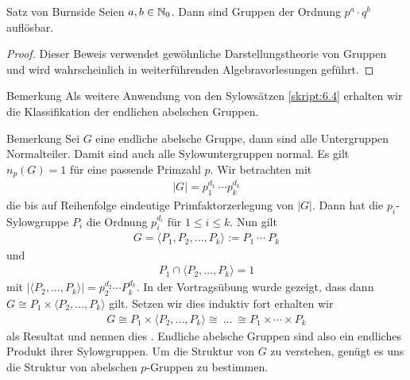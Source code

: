 \begin{genericthm_no_num}{Satz von Burnside}  
	Seien $ a,b \in \mathbb{N}_0 $.
	Dann sind Gruppen der Ordnung $ p^a \cdot q^b $ auflösbar.
\end{genericthm_no_num}

\begin{proof}
	Dieser Beweis verwendet gewöhnliche Darstellungstheorie von Gruppen und wird wahrscheinlich in weiterführenden Algebravorlesungen geführt.
\end{proof}

\begin{generic_no_num}{Bemerkung}
	Als weitere Anwendung von den Sylowsätzen \ref{skript:6.4} erhalten wir die Klassifikation der endlichen abelschen Gruppen.
\end{generic_no_num}

\begin{genericdf}{Bemerkung}\label{skript:6.9}
	Sei $ G $ eine endliche abelsche Gruppe, dann sind alle Untergruppen Normalteiler.
	Damit sind auch alle Sylowuntergruppen normal. Es gilt $ n_p(G) = 1 $ für eine passende Primzahl $ p $. 
	Wir betrachten mit 
	\begin{align*}
	|G| = p_1^{d_1} \ \cdots p_k^{d_k}
	\end{align*}
	die bis auf Reihenfolge eindeutige Primfaktorzerlegung von $ |G| $.
	Dann hat die $ p_i $-Sylowgruppe $ P_i $ die Ordnung $ p_i^{d_i} $ für $ 1 \leq i \leq k $. 
	Nun gilt
	\begin{align*}
	G = \langle P_1 , P_2,...,P_k \rangle := P_1 \ \cdots \ P_k
	\end{align*}
	und 
	\begin{align*}
	P_1 \cap \langle P_2, ..., P_k \rangle = 1
	\end{align*}
	mit $ |\langle P_2, ..., P_k \rangle | = p_2^{d_2} \cdots P_k^{d_k} $.
	In der Vortragsübung wurde gezeigt, dass dann $ G \cong P_1 \times \langle P_2, ..., P_k \rangle  $ gilt.
	Setzen wir dies induktiv fort erhalten wir
	\begin{align*}
	G \cong P_1 \times \langle P_2, ..., P_k \rangle \cong \ ... \ \cong P_1 \times \cdots \times P_k 
	\end{align*}
	als Resultat und nennen dies . 
	Endliche abelsche Gruppen sind also ein endliches Produkt ihrer Sylowgruppen.
	Um die Struktur von $ G $ zu verstehen, genügt es uns die Struktur von abelschen $ p $-Gruppen zu bestimmen.
\end{genericdf}